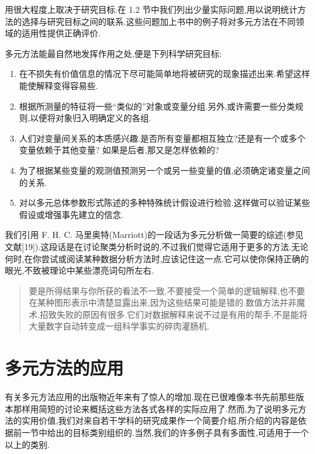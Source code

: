 用很大程度上取决于研究目标.在 1.2 节中我们列出少量实际问题,用以说明统计方法的选择与研究目标之间的联系.这些问题加上书中的例子将对多元方法在不同领域的适用性提供正确评价.

多元方法能最自然地发挥作用之处,便是下列科学研究目标:

\begin{enumerate}[label=\arabic*.,leftmargin=*,itemsep=2pt]
\item {}\quad 在不损失有价值信息的情况下尽可能简单地将被研究的现象描述出来.希望这样能使解释变得容易些.
\item {}\quad 根据所测量的特征将一些“类似的”对象或变量分组.另外,或许需要一些分类规则,以便将对象归入明确定义的各组.
\item {}\quad 人们对变量间关系的本质感兴趣.是否所有变量都相互独立?还是有一个或多个变量依赖于其他变量? 如果是后者,那又是怎样依赖的?
\item {}\quad 为了根据某些变量的观测值预测另一个或另一些变量的值,必须确定诸变量之间的关系.
\item {}\quad 对以多元总体参数形式陈述的多种特殊统计假设进行检验.这样做可以验证某些假设或增强事先建立的信念.
\end{enumerate}

我们引用 F. H. C. 马里奥特(Marriott)的一段话为多元分析做一简要的综述(参见文献[19]).这段话是在讨论聚类分析时说的,不过我们觉得它适用于更多的方法.无论何时,在你尝试或阅读某种数据分析方法时,应该记住这一点.它可以使你保持正确的眼光,不致被理论中某些漂亮词句所左右.

\begin{quote}
要是所得结果与你所获的看法不一致,不要接受一个简单的逻辑解释,也不要在某种图形表示中清楚显露出来,因为这些结果可能是错的.数值方法并非魔术,招致失败的原因有很多.它们对数据解释来说不过是有用的帮手,不是能将大量数字自动转变成一组科学事实的碎肉灌肠机.
\end{quote}

\section{多元方法的应用}
\label{sec:1.2}

有关多元方法应用的出版物近年来有了惊人的增加.现在已很难像本书先前那些版本那样用简短的讨论来概括这些方法各式各样的实际应用了.然而,为了说明多元方法的实用价值,我们对来自若干学科的研究成果作一个简要介绍.所介绍的内容是依据前一节中给出的目标类别组织的.当然,我们的许多例子具有多面性,可适用于一个以上的类别.

